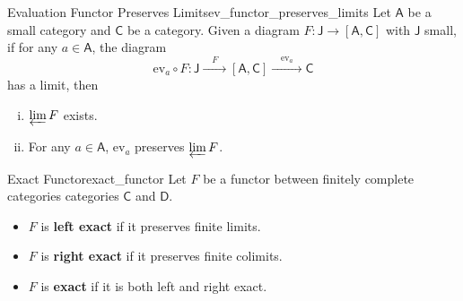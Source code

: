 \begin{proposition}{Evaluation Functor Preserves Limits}{ev_functor_preserves_limits}
    Let $\mathsf{A}$ be a small category and $\mathsf{C}$ be a category. Given a diagram $F: \mathsf{J} \to\left[\mathsf{A},\mathsf{C}\right]$ with $\mathsf{J}$ small, if for any $a\in \mathsf{A}$, the diagram 
    \[
        \mathrm{ev}_a \circ F:\mathsf{J}\xrightarrow{\quad F\quad}\left[\mathsf{A},\mathsf{C}\right]\xrightarrow{\quad\mathrm{ev}_a\quad}\mathsf{C}
    \]
    has a limit, then
    \begin{enumerate}[(i)]
        \item $\varprojlim F$ exists.
        \item For any $a\in \mathsf{A}$, $\mathrm{ev}_a$ preserves $\varprojlim F$.
    \end{enumerate}
\end{proposition}




\begin{definition}{Exact Functor}{exact_functor}
    Let $F$ be a functor between finitely complete categories categories $\mathsf{C}$ and $\mathsf{D}$.
    \begin{itemize}
        \item $F$ is \textbf{left exact} if it preserves finite limits.
        \item $F$ is \textbf{right exact} if it preserves finite colimits.
        \item $F$ is \textbf{exact} if it is both left and right exact.
    \end{itemize}
\end{definition}


